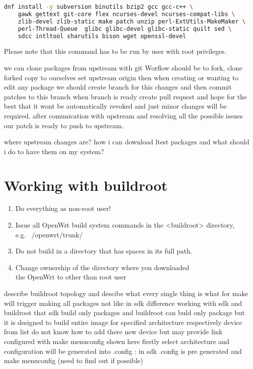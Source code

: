 \begin{lstlisting}[language=bash,basicstyle=\ttfamily\footnotesize,label=fedora-install,caption=Prerequisites installation on Fedora 27]
    dnf install -y subversion binutils bzip2 gcc gcc-c++ \
    gawk gettext git-core flex ncurses-devel ncurses-compat-libs \
    zlib-devel zlib-static make patch unzip perl-ExtUtils-MakeMaker \
    perl-Thread-Queue  glibc glibc-devel glibc-static quilt sed \
    sdcc intltool sharutils bison wget openssl-devel
\end{lstlisting}

Please note that this command has to be run by user with root privileges.

we can clone packages from upstream with git Worflow should be to fork, clone forked copy to ourselves set upstream origin then when creating or wanting to edit any package we should create branch for this changes and then commit patches to this branch
when branch is ready create pull request and hope for the best that it wont be automatically revoked and just minor changes will be required.
after comunication with upstream and resolving all the possible issues our patch is ready to push to upstream.

where upstream changes are? how i can download ltest packages and what should i do to have them on my system?

\section{Working with buildroot} \label{working-with-buildroot}
\begin{enumerate}
    \item Do everything as non-root user!
    \item Issue all OpenWrt build system commands in the <buildroot> directory, \\e.g. ~/openwrt/trunk/
    \item Do not build in a directory that has spaces in its full path.
    \item Change ownership of the directory where you downloaded \\the OpenWrt to other than root user
\end{enumerate}

describe buildroot topology and descibe what every single thing is what for
make will trigger making all packages not like in sdk
difference working with sdk and buildroot that sdk build only packages and buildroot can buld only package but it is designed to build entire image
for specified architecture respectively device from list
do not know how to add there new device but may provide link
configured with make menuconfig shown here firstly select architecture and configuration will be generated into .config :
in sdk .config is pre generated and make menuconfig (need to find out if possible)

